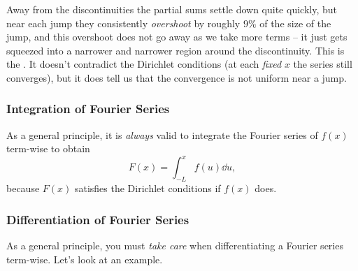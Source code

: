 \begin{center}
\end{center}

Away from the discontinuities the partial sums settle down quite quickly, but near each jump they consistently \emph{overshoot} by roughly $9\%$ of the size of the jump, and this overshoot does not go away as we take more terms -- it just gets squeezed into a narrower and narrower region around the discontinuity. This is the . It doesn't contradict the Dirichlet conditions (at each \emph{fixed} $x$ the series still converges), but it does tell us that the convergence is not uniform near a jump.

\subsubsection*{Integration of Fourier Series}

As a general principle, it is \emph{always} valid to integrate the Fourier series of $f(x)$ term-wise to obtain
$$
F(x) = \int_{-L}^x f(u) \dd u,
$$
because $F(x)$ satisfies the Dirichlet conditions if $f(x)$ does.

\subsubsection*{Differentiation of Fourier Series}

As a general principle, you must \emph{take care} when differentiating a Fourier series term-wise. Let's look at an example.

